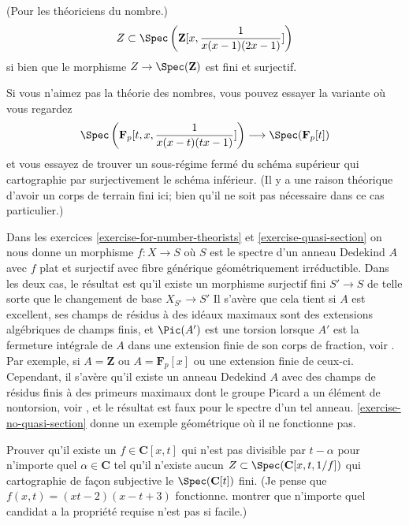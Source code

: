 \begin{exercise}
\label{exercise-for-number-theorists}
(Pour les théoriciens du nombre.)
$$
Z \subset \Spec\left({\mathbf Z}[x, \frac{1 }{ x(x-1)(2x-1)}]\right)
$$
si bien que le morphisme $Z \to \Spec({\mathbf Z})$ est
fini et surjectif.
\end{exercise}

\begin{exercise}
\label{exercise-quasi-section}
Si vous n'aimez pas la théorie des nombres, vous pouvez essayer
la variante où vous regardez
$$
\Spec\left({\mathbf F}_p[t, x, \frac{1 }{ x(x-t)(tx-1)}]\right)
\longrightarrow
\Spec({\mathbf F}_p[t])
$$
et vous essayez de trouver un sous-régime fermé du schéma
supérieur qui cartographie par surjectivement le schéma inférieur. (Il y a
une raison théorique d'avoir un corps de terrain fini ici; bien
qu'il ne soit pas nécessaire dans ce cas particulier.)
\end{exercise}

\begin{remark}
\label{remark-interpretation-skolem-noether}
Dans les exercices \ref{exercise-for-number-theorists} et \ref{exercise-quasi-section} on nous donne
un morphisme $f : X \to S$ où $S$ est le
spectre d'un anneau Dedekind $A$ avec $f$ plat et surjectif avec
fibre générique géométriquement irréductible. Dans les deux cas, le résultat est qu'il
existe un morphisme surjectif fini $S' \to S$ de telle sorte que le
changement de base $X_{S'} \to S'$ Il s'avère que cela
tient si $A$ est excellent, ses champs de résidus à des
idéaux maximaux sont des extensions algébriques de champs finis, et
$\Pic(A')$ est une torsion lorsque $A'$ est la fermeture intégrale
de $A$ dans une extension finie de son corps de fraction, voir
\cite{MB1}. Par exemple, si $A = \mathbf{Z}$ ou $A = \mathbf{F}_p[x]$ ou
une extension finie de ceux-ci. Cependant,
il s'avère qu'il existe un anneau Dedekind $A$ avec des champs de
résidus finis à des primeurs maximaux dont le groupe Picard a un élément
de nontorsion, voir \cite{Goldman}, et le résultat est faux pour
le spectre d'un tel anneau. \ref{exercise-no-quasi-section} donne un exemple géométrique où
il ne fonctionne pas.
\end{remark}

\begin{exercise}
\label{exercise-no-quasi-section}
Prouver qu'il existe un $f \in \mathbf{C}[x, t]$ qui n'est pas divisible
par $t - \alpha$ pour n'importe quel $\alpha \in \mathbf{C}$
tel qu'il n'existe aucun $Z \subset \Spec(\mathbf{C}[x, t, 1/f])$ qui cartographie de
façon subjective le $\Spec(\mathbf{C}[t])$ fini. (Je pense que $f(x, t)
= (xt - 2)(x - t + 3)$ fonctionne. montrer que n'importe quel
candidat a la propriété requise n'est pas si facile.)
\end{exercise}

